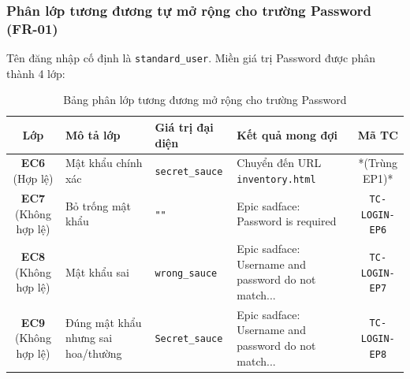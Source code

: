 \documentclass[a4paper]{article}
\renewcommand{\arraystretch}{1.25}
\begin{document}
\subsubsection{Phân lớp tương đương tự mở rộng cho trường Password (FR-01)}
Tên đăng nhập cố định là \texttt{standard\_user}. Miền giá trị Password được phân thành 4 lớp:
\begin{table}[H]
\centering
\small
\renewcommand{\arraystretch}{1.15}
\begin{tabularx}{\textwidth}{|c|>{\raggedright\arraybackslash}p{4cm}|l|>{\raggedright\arraybackslash}X|c|}
\hline
\textbf{Lớp} & \textbf{Mô tả lớp} & \textbf{Giá trị đại diện} & \textbf{Kết quả mong đợi} & \textbf{Mã TC} \\ \hline
\makecell[t]{\textbf{EC6}\\\scriptsize(Hợp lệ)} & Mật khẩu chính xác & \texttt{secret\_sauce} & Chuyển đến URL \texttt{inventory.html} & *(Trùng EP1)* \\ \hline
\makecell[t]{\textbf{EC7}\\\scriptsize(Không hợp lệ)} & Bỏ trống mật khẩu & \texttt{""} & Epic sadface: Password is required & \texttt{TC-LOGIN-EP6} \\ \hline
\makecell[t]{\textbf{EC8}\\\scriptsize(Không hợp lệ)} & Mật khẩu sai & \texttt{wrong\_sauce} & Epic sadface: Username and password do not match... & \texttt{TC-LOGIN-EP7} \\ \hline
\makecell[t]{\textbf{EC9}\\\scriptsize(Không hợp lệ)} & Đúng mật khẩu nhưng sai hoa/thường & \texttt{Secret\_sauce} & Epic sadface: Username and password do not match... & \texttt{TC-LOGIN-EP8} \\ \hline
\end{tabularx}
\caption{Bảng phân lớp tương đương mở rộng cho trường Password}
\end{table}
\end{document}
